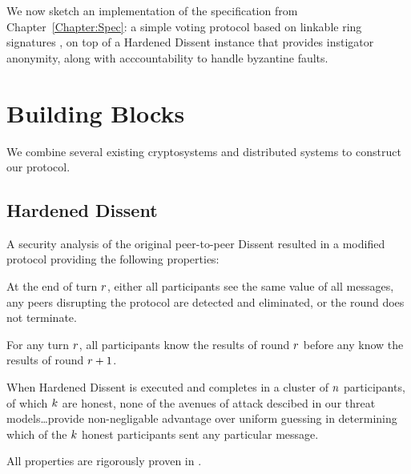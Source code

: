 We now sketch an implementation of the specification from
Chapter~\ref{Chapter:Spec}: a simple voting protocol based on linkable ring
signatures \cite{lrs}, on top of a Hardened Dissent \cite{sec} instance that
provides instigator anonymity, along with acccountability to handle byzantine
faults.
\section{Building Blocks}
We combine several existing cryptosystems and distributed systems to construct
our protocol.
\subsection{Hardened Dissent}
A security analysis of the original peer-to-peer Dissent resulted in a modified
protocol providing the following properties:
  \begin{theorem} At the end of turn $r$, either all participants see the
    same value of all messages, any peers disrupting the protocol are detected
    and eliminated, or the round does not terminate.%
  \end{theorem}
  \begin{theorem} For any turn $r$, all participants know the results of
    round $r$ before any know the results of round
    $r+1$.\end{theorem}\label{theorem:rounds}
  \begin{theorem}[Anonymity] When Hardened Dissent is executed and completes in
    a cluster of $n$ participants, of which $k$ are honest,
    none of the avenues of attack descibed in our threat models\ldots provide
    non-negligable advantage over uniform guessing in determining which of the
    $k$ honest participants sent any particular message.
  \end{theorem}\label{theorem:anon}
  All properties are rigorously proven in \cite{sec}.

